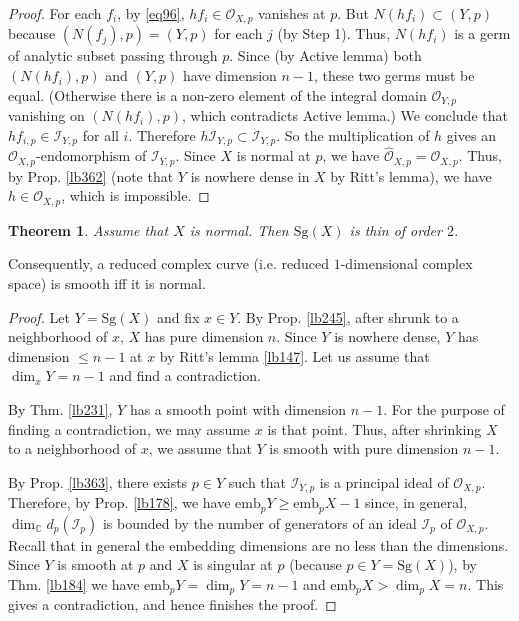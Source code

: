 \documentclass[12pt,b5paper,notitlepage]{report}
\theoremstyle{definition}
\theoremstyle{plain}
\newtheorem{thm}[df]{Theorem}
\newcommand{\mc}{\mathcal}
\newcommand{\wht}{\widehat}
\newcommand{\scr}{\mathscr}
\newcommand{\Cbb}{\mathbb C}
\newcommand{\emb}{\mathrm{emb}}
\newcommand{\Sg}{\mathrm{Sg}}
\numberwithin{equation}{section}
\begin{document}
\begin{proof}
For each $f_i$,  by \eqref{eq96}, $hf_i\in\scr O_{X,p}$ vanishes at $p$. But $N(hf_i)\subset (Y,p)$ because $(N(f_j),p)=(Y,p)$ for each $j$ (by Step 1). Thus, $N(hf_i)$ is a germ of analytic subset passing through $p$. Since (by Active lemma) both $(N(hf_i),p)$ and $(Y,p)$ have dimension $n-1$, these two germs must be equal. (Otherwise there is a non-zero element of the integral domain $\scr O_{Y,p}$ vanishing on $(N(hf_i),p)$, which contradicts Active lemma.) We conclude that $hf_{i,p}\in\scr I_{Y,p}$ for all $i$. Therefore $h\scr I_{Y,p}\subset\scr I_{Y,p}$. So the multiplication of $h$ gives an $\scr O_{X,p}$-endomorphism of $\scr I_{Y,p}$. Since $X$ is normal at $p$, we have $\wht{\scr O}_{X,p}=\scr O_{X,p}$. Thus, by Prop. \ref{lb362} (note that $Y$ is nowhere dense in $X$ by Ritt's lemma), we have $h\in\scr O_{X,p}$, which is impossible. 
\end{proof}



\begin{thm}\label{lb232}
Assume that $X$ is normal. Then $\Sg(X)$ is thin of order $2$.
\end{thm}



Consequently, a reduced complex curve (i.e. reduced $1$-dimensional complex space) is smooth iff it is normal.

\begin{proof}
Let $Y=\Sg(X)$ and fix $x\in Y$. By Prop. \ref{lb245}, after shrunk to a neighborhood of $x$, $X$ has pure dimension $n$. Since $Y$ is nowhere dense, $Y$ has dimension $\leq n-1$ at $x$ by Ritt's lemma \ref{lb147}. Let us assume that $\dim_xY=n-1$ and find a contradiction.

By Thm. \ref{lb231}, $Y$ has a smooth point with dimension $n-1$. For the purpose of finding a contradiction, we may assume $x$ is that point. Thus, after shrinking $X$ to a neighborhood of $x$, we assume that $Y$ is smooth with pure dimension $n-1$.


By Prop. \ref{lb363}, there exists $p\in Y$ such that $\scr I_{Y,p}$ is a principal ideal of $\scr O_{X,p}$. Therefore, by Prop. \ref{lb178}, we have $\emb_p Y\geq \emb_pX-1$ since, in general, $\dim_\Cbb d_p(\mc I_p)$ is bounded by the number of generators of an ideal $\mc I_p$ of $\scr O_{X,p}$. Recall that in general the embedding dimensions are no less than the dimensions. Since $Y$ is smooth at $p$ and $X$ is singular at $p$ (because $p\in Y=\Sg(X)$), by Thm. \ref{lb184} we have $\emb_pY=\dim_pY=n-1$ and $\emb_p X>\dim_pX=n$. This gives a contradiction, and hence finishes the proof.
\end{proof}
\end{document}
